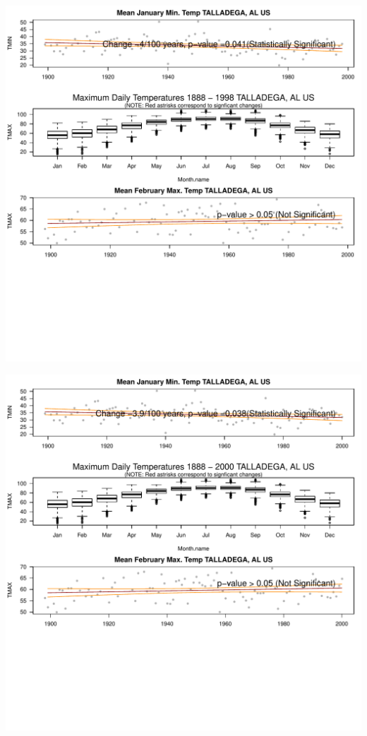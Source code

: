 \documentclass{article}\usepackage[]{graphicx}\usepackage[]{color}
\makeatletter
\def\maxwidth{ %
  \ifdim\Gin@nat@width>\linewidth
    \linewidth
  \else
    \Gin@nat@width
  \fi
}
\newenvironment{knitrout}{}{} %
\makeatother
\begin{document}
\begin{knitrout}
\includegraphics[width=\maxwidth]{figure/static_template-45} 

\includegraphics[width=\maxwidth]{figure/static_template-46} 


\end{knitrout}
\end{document}
